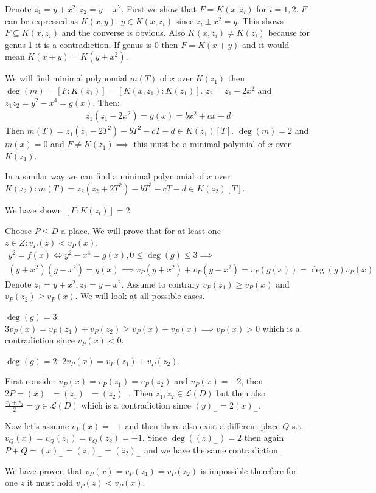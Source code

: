 \documentclass[12pt, a4paper]{article}
\begin{document}
Denote $z_1=y+x^2, z_2=y-x^2$. First we show that $F=K(x,z_i)$ for $i=1,2$. $F$ can be expressed as $K(x,y)$. $y\in K(x,z_i)$ since $z_i \pm x^2 = y$. This shows $F \subseteq K(x,z_i)$ and the converse is obvious. Also $K(x,z_i) \neq K(z_i)$ because for genus 1 it is a contradiction. If genus is 0 then $F=K(x+y)$ and it would mean $K(x+y)=K(y \pm x^2)$. 

We will find minimal polynomial $m(T)$ of $x$ over $K(z_1)$ then $\deg(m) = [F:K(z_1)]=[K(x,z_1):K(z_1)]$. $z_2 = z_1 - 2x^2$ and $z_1z_2=y^2-x^4=g(x)$. Then:
\begin{gather*}
z_1(z_1-2x^2) = g(x) = bx^2+cx+d
\end{gather*}
Then $m(T)=z_1(z_1-2T^2)-bT^2-cT-d \in K(z_1)[T]$. $\deg(m)=2$ and $m(x)=0$ and $F\neq K(z_1) \implies$ this must be a minimal polymial of $x$ over $K(z_1)$.

In a similar way we can find a minimal polynomial of $x$ over $K(z_2): m(T) = z_2(z_2+2T^2)-bT^2-cT-d \in K(z_2)[T]$.

We have shown $[F:K(z_i)]=2$.


Choose $P \leq D$ a place. We will prove that for at least one $z \in Z: v_P(z) < v_P(x)$.
\begin{gather*}
y^2 = f(x) \iff y^2 - x^4 = g(x), 0 \leq \deg(g) \leq 3 \implies\\
(y+x^2)(y-x^2)=g(x) \implies v_P(y+x^2)+v_P(y-x^2) = v_P(g(x)) = \deg(g)v_P(x)
\end{gather*}
Denote $z_1 = y+x^2, z_2=y-x^2$. Assume to contrary $v_P(z_1) \geq v_P(x)$ and $v_P(z_2) \geq v_P(x)$. We will look at all possible cases.

$\deg(g)=3$: $3v_P(x)=v_P(z_1)+v_P(z_2) \geq v_P(x)+v_P(x) \implies v_P(x) > 0$ which is a contradiction since $v_P(x)<0$.

$\deg(g)=2$: $2v_P(x)=v_P(z_1)+v_P(z_2)$. 

First consider $v_P(x)=v_P(z_1)=v_P(z_2)$ and $v_P(x)=-2$, then $2P = (x)_{-}= (z_1)_{-} = (z_2)_{-}$. Then $z_1, z_2 \in \mathcal{L}(D)$ but then also $\frac{z_1+z_2}{2} = y \in \mathcal{L}(D)$ which is a contradiction since $(y)_{-}=2(x)_{-}$.

Now let's assume $v_P(x)=-1$ and then there also exist a different place $Q$ s.t. $v_Q(x)=v_Q(z_1)=v_Q(z_2)=-1$. Since $\deg((z)_{-})=2$ then again $P+Q = (x)_{-}= (z_1)_{-} = (z_2)_{-}$ and we have the same contradiction.

We have proven that $v_P(x)=v_P(z_1)=v_P(z_2)$ is impossible therefore for one $z$ it must hold $v_P(z)<v_P(x)$.
\end{document}
